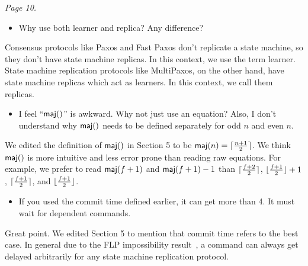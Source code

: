 \documentclass[letterpaper,twocolumn,10pt]{article}
\newenvironment{reviewerquote}
{\list{}{\leftmargin=\parindent\rightmargin=0in}\item[] \itshape \color{ReviewerDarkGray}}%
{\endlist}
\begin{document}
\begin{reviewerquote}
  Page 10.

  \begin{itemize}
    \item
      Why use both learner and replica? Any difference?
  \end{itemize}
\end{reviewerquote}

Consensus protocols like Paxos and Fast Paxos don't replicate a state machine,
so they don't have state machine replicas. In this context, we use the term
learner. State machine replication protocols like MultiPaxos, on the other
hand, have state machine replicas which act as learners. In this context, we
call them replicas.

\begin{reviewerquote}
  \begin{itemize}
    \item
      I feel ``$\textsf{maj}()$'' is awkward. Why not just use an equation? Also, I
      don't understand why $\textsf{maj}()$ needs to be defined separately for odd $n$
      and even $n$.
  \end{itemize}
\end{reviewerquote}

We edited the definition of $\textsf{maj}()$ in Section 5 to be $\textsf{maj}(n) =
\lceil\frac{n+1}{2}\rceil$. We think $\textsf{maj}()$ is more intuitive and less error prone
than reading raw equations. For example, we prefer to read $\textsf{maj}(f+1)$ and
$\textsf{maj}(f+1) - 1$ than $\lceil\frac{f+2}{2}\rceil$, $\lfloor\frac{f+1}{2}\rfloor + 1$,
$\lceil\frac{f+1}{2}\rceil$, and $\lfloor\frac{f+1}{2}\rfloor$.

\begin{reviewerquote}
  \begin{itemize}
    \item
      If you used the commit time defined earlier, it can get more than 4. It
      must wait for dependent commands.
  \end{itemize}
\end{reviewerquote}

Great point. We edited Section 5 to mention that commit time refers to the best
case. In general due to the FLP impossibility
result~\cite{fischer1982impossibility}, a command can always get delayed
arbitrarily for any state machine replication protocol.
\end{document}
